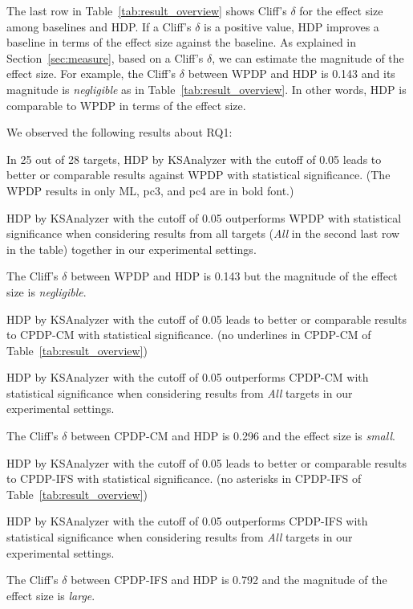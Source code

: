 The last row in Table~\ref{tab:result_overview} shows Cliff's $\delta$ for the effect size among baselines and HDP. If a Cliff's $\delta$ is a positive value, HDP improves a baseline in terms of the effect size against the baseline. As explained in Section~\ref{sec:measure}, based on a Cliff's $\delta$, we can estimate the magnitude of the effect size. For example, the Cliff's $\delta$ between WPDP and HDP is 0.143 and its magnitude is {\em negligible} as in Table~\ref{tab:result_overview}. In other words, HDP is comparable to WPDP in terms of the effect size.

We observed the following results about RQ1:
\squishlist
	\item In 25 out of 28 targets, HDP by KSAnalyzer with the cutoff of
	0.05 leads to better or comparable results against WPDP with statistical
	significance. (The WPDP results in only ML, pc3, and pc4 are in bold font.)
	\item HDP by KSAnalyzer with the cutoff of 0.05 outperforms
	WPDP with statistical significance when considering
	results from all targets ({\em All} in the second last row in the table) together in
	our experimental settings.
	\item The Cliff's $\delta$ between WPDP and HDP is 0.143 but the magnitude of the effect size is {\em negligible}.
	\item HDP by KSAnalyzer with the cutoff of 0.05
	leads to better or comparable results to CPDP-CM
	with statistical significance. (no underlines in CPDP-CM of
	Table~\ref{tab:result_overview})
	\item HDP by KSAnalyzer with the cutoff of 0.05 outperforms
	CPDP-CM with statistical significance
	when considering results from {\em All} targets in our experimental
	settings.
	\item The Cliff's $\delta$ between CPDP-CM and HDP is 0.296 and the effect size is {\em small}.
	\item HDP by KSAnalyzer with the cutoff of 0.05
	leads to better or comparable results to CPDP-IFS with
	statistical significance. (no asterisks in CPDP-IFS of
	Table~\ref{tab:result_overview})
	\item HDP by KSAnalyzer with the cutoff of 0.05 outperforms
	CPDP-IFS with statistical significance
	when considering results from {\em All} targets in our experimental
	settings.
	\item The Cliff's $\delta$ between CPDP-IFS and HDP is 0.792 and the magnitude of the effect size is {\em large}.
\squishend  
